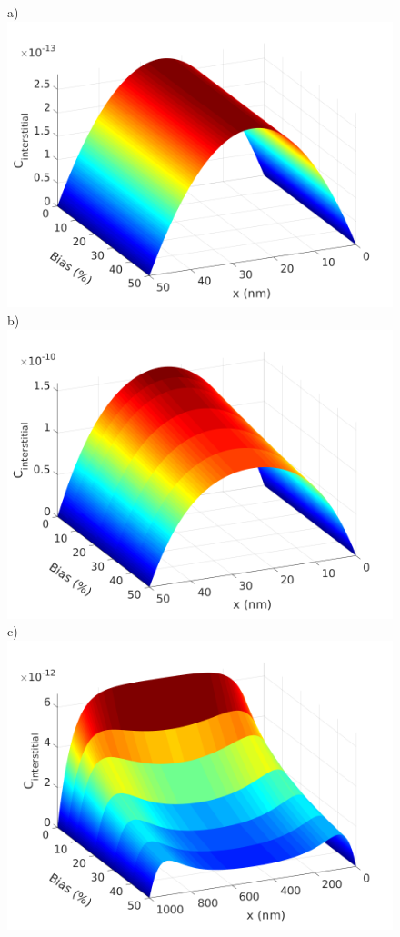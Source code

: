 \documentclass[utf8]{frontiersSCNS} %
\begin{document}
   \begin{figure}[htb!]
        \centering
        a)\includegraphics[scale=0.3]{Fig6_a}
        b)\includegraphics[scale=0.3]{Fig6_b}
        c)\includegraphics[scale=0.3]{Fig6_c}

\end{figure}
\end{document}

